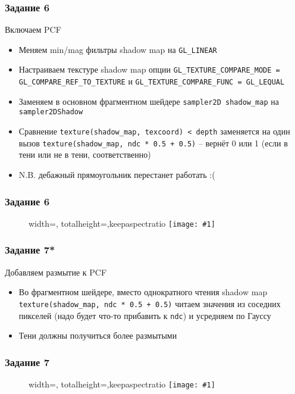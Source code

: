 \documentclass{beamer}
\newcommand{\slideimage}[1]{
  \begin{figure}
    \begin{adjustbox}{width=\textwidth, totalheight=\textheight-2\baselineskip-2\baselineskip,keepaspectratio}
      \texttt{[image: \#1]}
    \end{adjustbox}
  \end{figure}
}
\begin{document}
\begin{frame}[fragile]
\frametitle{Задание 6}
\fontsize{10pt}{10pt}
Включаем PCF
\begin{itemize}
\item Меняем min/mag фильтры shadow map на \verb|GL_LINEAR|
\item Настраиваем текстуре shadow map опции \verb|GL_TEXTURE_COMPARE_MODE = GL_COMPARE_REF_TO_TEXTURE| и \verb|GL_TEXTURE_COMPARE_FUNC = GL_LEQUAL|
\item Заменяем в основном фрагментном шейдере \verb|sampler2D shadow_map| на \verb|sampler2DShadow|
\item Сравнение \verb|texture(shadow_map, texcoord) < depth| заменяется на один вызов \verb|texture(shadow_map, ndc * 0.5 + 0.5)| -- вернёт 0 или 1 (если в тени или не в тени, соответственно)
\item N.B. дебажный прямоугольник перестанет работать :(
\end{itemize}
\end{frame}

\begin{frame}[fragile]
\frametitle{Задание 6}
\slideimage{6.png}
\end{frame}

\begin{frame}[fragile]
\frametitle{Задание 7*}
\fontsize{10pt}{10pt}
Добавляем размытие к PCF
\begin{itemize}
\item Во фрагментном шейдере, вместо однократного чтения shadow map \verb|texture(shadow_map, ndc * 0.5 + 0.5)| читаем значения из соседних пикселей (надо будет что-то прибавить к \verb|ndc|) и усредняем по Гауссу
\item Тени должны получиться более размытыми
\end{itemize}
\end{frame}

\begin{frame}[fragile]
\frametitle{Задание 7}
\slideimage{7.png}
\end{frame}
\end{document}
